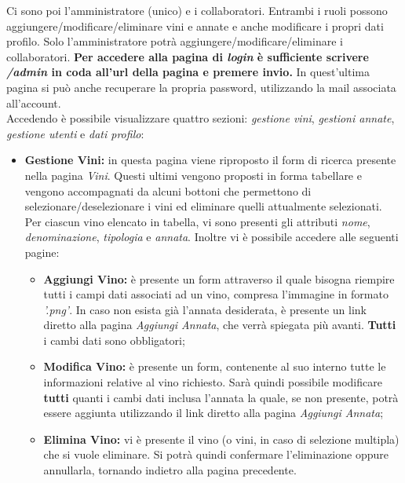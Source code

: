 Ci sono poi l'amministratore (unico) e i collaboratori. Entrambi i ruoli possono aggiungere/modificare/eliminare vini e annate e anche modificare i propri dati profilo. Solo l'amministratore potrà aggiungere/modificare/eliminare i collaboratori.
\textbf{Per accedere alla pagina di \textit{login} è sufficiente scrivere \textit{/admin} in coda all'url della pagina e premere invio.} In quest'ultima pagina si può anche recuperare la propria password, utilizzando la mail associata all'account.\\
Accedendo è possibile visualizzare quattro sezioni: \textit{gestione vini}, \textit{gestioni annate}, \textit{gestione utenti} e \textit{dati profilo}:

\begin{itemize}
	\item \textbf{Gestione Vini:} in questa pagina viene riproposto il form di ricerca presente nella pagina \textit{Vini}. Questi ultimi vengono proposti in forma tabellare e vengono accompagnati da alcuni bottoni che permettono di selezionare/deselezionare i vini ed eliminare quelli attualmente selezionati. Per ciascun vino elencato in tabella, vi sono presenti gli attributi \textit{nome}, \textit{denominazione}, \textit{tipologia} e \textit{annata}. Inoltre vi è possibile accedere alle seguenti pagine:
		\begin{itemize}
			\item \textbf{Aggiungi Vino:} è presente un form attraverso il quale bisogna riempire tutti i campi dati associati ad un vino, compresa l'immagine in formato \textit{'.png'}. In caso non esista già l'annata desiderata, è presente un link diretto alla pagina \textit{Aggiungi Annata}, che verrà spiegata più avanti. \textbf{Tutti} i cambi dati sono obbligatori;
			\item \textbf{Modifica Vino:} è presente un form, contenente al suo interno tutte le informazioni relative al vino richiesto. Sarà quindi possibile modificare \textbf{tutti} quanti i cambi dati inclusa l'annata la quale, se non presente, potrà essere aggiunta utilizzando il link diretto alla pagina \textit{Aggiungi Annata};
			\item \textbf{Elimina Vino:} vi è presente il vino (o vini, in caso di selezione multipla) che si vuole eliminare. Si potrà quindi confermare l'eliminazione oppure annullarla, tornando indietro alla pagina precedente.
		\end{itemize}
	

\end{itemize}

